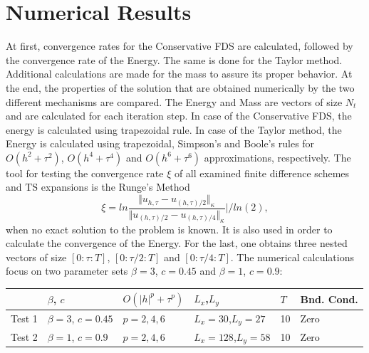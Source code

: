 \documentclass[%
 aip,
cp,  %
 amsmath,amssymb,%
 reprint,%
]{revtex4-2}
\begin{document}
\section{Numerical Results}

At first, convergence rates for the Conservative FDS are calculated, followed by the convergence rate of the Energy. The same is done for the Taylor method. Additional calculations are made for the mass to assure its proper behavior. At the end, the properties of the solution that are obtained numerically by the two different mechanisms are compared. The Energy and Mass are vectors of size $N_t$ and are calculated for each iteration step. In case of the Conservative FDS, the energy is calculated using trapezoidal rule. In case of the Taylor method, the Energy is calculated using trapezoidal, Simpson's and Boole's rules for $O(h^{2} + \tau^2 )$, $O(h^{4} + \tau^4 )$ and $O(h^{6} + \tau^6 )$ approximations, respectively. The tool for testing the convergence rate $\xi$ of all examined finite difference schemes and TS expansions is the Runge's Method
\begin{equation}\label{Runge}
\xi = ln  \frac{\Vert u_{h,\tau} - u_{(h,\tau)/2} \Vert_\kappa } {\Vert  u_{(h,\tau)/2} - u_{(h,\tau)/4} \Vert_\kappa  } | / ln(2),
\end{equation}
when no exact solution to the problem is known. It is also used in order to calculate the convergence of the Energy. For the last, one obtains three nested vectors of size $[0:\tau:T]$, $[0:\tau/2:T]$ and $[0:\tau/4:T]$. The numerical calculations focus on two parameter sets $\beta = 3$, $c=0.45$ and $\beta = 1$, $c=0.9$:

\begin{table}[ht]
\centering
\small
		\begin{tabular}{||c|l|l|l|l|l||}
			\hline
			\hline
                                            &    $\beta$, $c$                              & $O(|h|^p + \tau^p)$                                 & $L_x$,$L_y$                                & $T$      &  Bnd. Cond.   \\

   			\hline 
					\hline 
           Test 1                        &      $\beta = 3$, $c=0.45$           &      $p=2, 4, 6$                              & $L_x = 30$,$L_y=27$                &                10    &    Zero  \\
	   \hline
			\hline 
           Test 2                        &      $\beta = 1$, $c=0.9$             &      $p=2, 4, 6$                              & $L_x = 128$,$L_y=58$                &               10    &   Zero  \\
	   \hline
			\hline 
		\end{tabular}

\end{table}
\end{document}

